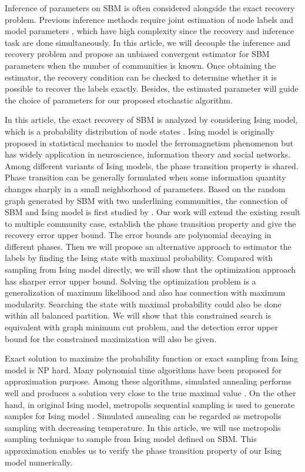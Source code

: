 \documentclass[entropy,article,submit,moreauthors,pdftex]{Definitions/mdpi}
\newcommand{\1}{\mathbbm{1}}
\begin{document}
Inference of parameters on SBM is often considered alongside the exact recovery problem.
Previous inference methods require joint estimation of node labels and model parameters \cite{nowicki2001estimation}, which have high complexity since the recovery and inference task are done simultaneously.
In this article, we will decouple the inference and recovery problem and propose an unbiased convergent estimator for SBM parameters when the number of communities is known. Once obtaining the estimator, the recovery condition can be checked to determine whether it is possible to recover the labels
exactly. Besides, the estimated parameter will guide the choice of parameters for our proposed stochastic algorithm.

In this article, the exact recovery of SBM is analyzed by considering
Ising model, which is a probability distribution of node states \cite{ising1925beitrag}.
Ising model is originally proposed in statistical mechanics to model the ferromagnetism phenomenon but has widely application in neuroscience, information theory
and social networks. Among different variants of Ising models, the phase transition property is shared. Phase transition can be generally formulated when
some information quantity changes sharply in a small neighborhood of parameters.
Based on the random graph generated by SBM with two underlining communities,
the connection of SBM and Ising model is first studied by \cite{ye2020exact}. Our work will extend the existing result to multiple community case, establish the phase transition
property and give the recovery error upper bound. The error bounds are polynomial decaying in different phases.
Then we will propose an alternative approach to estimator the labels by finding the Ising state with maximal probability.
Compared with sampling from Ising model directly,
we will show that the optimization approach has sharper error upper bound. Solving the optimization problem
is a generalization of maximum likelihood and also has connection with maximum modularity.
Searching the state with maximal probability
could also be done within all balanced partition. We will show that this constrained search is equivalent with graph minimum cut problem, and the detection
error upper bound for the constrained maximization will also be given.

Exact solution to maximize the probability function or exact sampling from Ising model is NP hard. Many polynomial time algorithms have been proposed for approximation purpose.
Among these algorithms, simulated annealing performs well and produces a solution very close to the true maximal value \cite{liu2010detecting}.
On the other hand, in original Ising model,
metropolis sequential sampling is used to generate samples for Ising model \cite{metropolis1953equation}. Simulated annealing can be regarded as metropolis sampling with decreasing temperature. In this article, we will
use metropolis sampling technique to sample from Ising model defined on SBM. This approximation enables us to verify the phase transition property of our Ising model  numerically.
\end{document}
